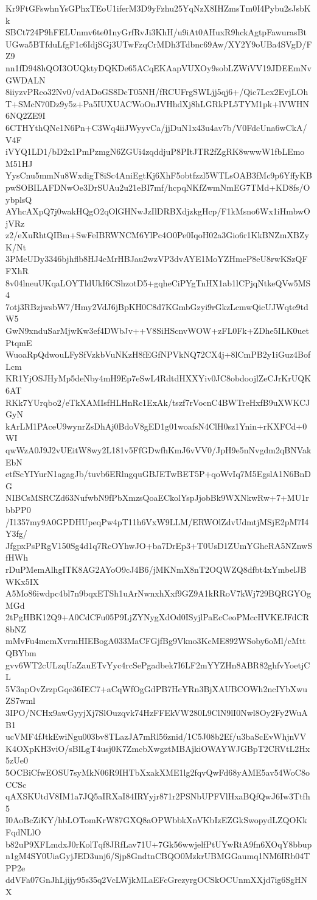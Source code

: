 Kr9FtGFswhnYsGPhxTEoU1iferM3D9yFzhu25YqNzX8IHZmsTm0I4Pybu2sJsbKk
SBCt724P9hFELUnmv6te01nyGrfRvJi3KhH/u9iAt0AHuxR9hckAgtpFawurasBt
UGwa5BTfduLfgF1c6IdjSGj3UTwFzqCrMDh3Tdbnc69Aw/XY2Y9oUBa4SVgD/FZ9
nn1fD948hQOI3OUQktyDQKDe65ACqEKAapVUXOy9sobLZWiVV19JDEEmNvGWDALN
8iiyzvPRco32Nv0/vdADoGS8DcT05NH/fRCUFrgSWLjj5qj6+/Qic7Lcx2EvjLOh
T+SMcN70Dz9y5z+Pa5IUXUACWoOnJVHhdXj8hLGRkPL5TYM1pk+lVWHN6NQ2ZE9I
6CTHYthQNe1N6Pn+C3Wq4iiJWyyvCa/jjDuN1x43u4av7b/V0FdcUna6wCkA/V4F
iVYQ1LD1/bD2x1PmPzmgN6ZGUi4zqddjuP8PItJTR2fZgRK8wwwW1fbLEmoM51HJ
YysCnu5mmNu8WxdigT8iSc4AniEgtKj6XhF5obtfzzl5WTLsOAB3fMc9p6YffyKB
pwSOBILAFDNwOe3DrSUAu2u21eBI7mf/hcpqNKfZwmNmEG7TMd+KD8fs/OybplsQ
AYhcAXpQ7j0wakHQgO2qOlGHNwJzIlDRBXdjzkgHcp/F1kMsno6Wx1iHmbwOjVRz
z2/eXuRhtQIBm+SwFeIBRWNCM6YlPc4O0Pe0IqoH02a3Gio6r1KkBNZmXBZyK/Nt
3PMeUDy3346bjhflb8HJ4cMrHBJau2wzVP3dvAYE1MoYZHmeP8eU8rwKSzQFFXhR
8v04lneuUKqaLOYTldUkI6CShzotD5+gqheCiPYgTnHX1ab1lCPjqNtkeQVw5MS4
7otj3RBzjwsbW7/Hmy2VdJ6jBpKH0C8d7KGmbGzyi9rGkzLcmwQicUJWqte9tdW5
GwN9xnduSarMjwKw3ef4DWbJv++V8SiHScnvWOW+zFL0Fk+ZDhe5ILK0uetPtqmE
WuoaRpQdwouLFySfVzkbVuNKzH8fEGfNPVkNQ72CX4j+8lCmPB2y1iGuz4BofLcm
KR1YjOSJHyMp5deNby4mH9Ep7eSwL4RdtdHXXYiv0JC8obdoojlZeCJrKrUQK6AT
RKk7YUrqbo2/eTkXAMIsfHLHnRc1ExAk/tszf7rVocnC4BWTreHxfB9uXWKCJGyN
kArLM1PAceU9wynrZsDhAj0BdoV8gED1g01woafsN4ClH0sz1Ynin+rKXFCd+0WI
qwWzA0J9J2vUEitW8wy2L181v5FfGDwfhKmJ6vVV0/JpH9e5nNvgdm2qBNVakEbN
etfScYIYurN1agagJb/tuvb6ERlngquGBJETwBET5P+qoWvIq7M5EgslA1N6BnDG
NIBCsMSRCZd63NufwbN9fPbXmzsQoaECkolYspJjobBk9WXNkwRw+7+MU1rbbPP0
/I1357my9A0GPDHUpeqPw4pT11h6VxW9LLM/ERWOlZdvUdmtjMSjE2pM7I4Y3fg/
JfgpxPsPRgV150Sg4d1q7RcOYhwJO+ba7DrEp3+T0UsD1ZUmYGheRA5NZnwSfHWh
rDuPMemAlhgITK8AG2AYoO9cJ4B6/jMKNmX8nT2OQWZQ8dfbt4xYmbelJBWKx5IX
A5Mo86iwdpc4bl7n9bqxETSh1uArNwnxhXxf9GZ9A1kRRoV7kWj729BQRGYOgMGd
2tPgHBK12Q9+A0CdCFu05P9LjZYNygXdOd0ISyjlPaEcCeoPMccHVKEJFdCR8bNZ
mMvFu4mcmXvrmHIEBogA033MaCFGjfBg9Vkno3KcME892WSoby6oMl/cMttQBYbm
gvv6WT2cULzqUaZauETvYyc4rcSePgadbek7I6LF2mYYZHn8ABR82ghfvYoetjCL
5V3apOvZrzpGqe36IEC7+aCqWfOgGdPB7HcYRn3BjXAUBCOWh2ncIYbXwuZS7wml
3IPO/NCHx9awGyyjXj7SlOuzqvk74HzFFEkVW280L9ClN9lI0Nwl8Oy2Fy2WuAB1
ucVMF4fJtkEwiNgu003bv8TLazJA7mRl56znid/1C5J08b2Ef/u3baScEvWhjnVV
K4OXpKH3viO/sBlLgT4usj0K7ZmcbXwgztMBAjkiOWAYWJGBpT2CRVtL2Hx5zUe0
5OCBiCfwEOSU7syMkN06R9IHTbXxakXME1lg2fqvQwFd68yAME5av54WoC8oCCSc
qAXSKUtdV8IM1a7JQ5aIRXaI84IRYyjr871r2PSNbUPFVlHxaBQfQwJ6Iw3Ttfh5
I0AoBcZiKY/hbLOTomKrW87GXQ8aOPWbbkXnVKbIzEZGkSwopydLZQOKkFqdNLlO
b82uP9XFLmdxJ0rKolTqf8JRfLav71U+7Gk56wwjelfPtUYwRtA9fn6XOqY8bbup
n1gM4SY0UiaGyjJED3unj6/Sjp8GndtnCBQO0MzkrUBMGGaumq1NM6IRb04TPP2e
ddVFa07GnJhLjijy95s35q2VcLWjkMLaEFcGrezyrgOCSkOCUnmXXjd7ig6SgHNX
